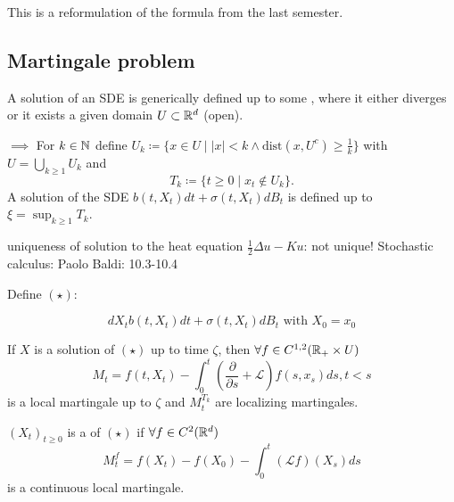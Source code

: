 \begin{remark}
    This is a reformulation of the formula from the last semester.
\end{remark}

\subsection{Martingale problem}

A solution of an SDE is generically defined up to some ,
where it either diverges or it exists a given domain $U\subset\mathbb{R}^d$ (open).

$\implies$ For $k\in\mathbb{N}$ define $U_k\coloneqq \{x\in U\mid |x|<k\land \text{dist}(x,U^c)\geq \frac{1}{k}\}$
with $U=\bigcup_{k\geq 1} U_k$ and 
\[T_k\coloneqq \{t\geq 0\mid x_t\notin U_k\}.\]
A solution of the SDE $b(t,X_t)dt+ \sigma(t,X_t)dB_t$ is defined up to $\xi=\sup_{k\geq 1} T_k$.



\begin{aremark}
    uniqueness of solution to the heat equation $\frac{1}{2}\Delta u -Ku$: not unique!
    Stochastic calculus: Paolo Baldi: 10.3-10.4
\end{aremark}


Define $(\star)$:

\[dX_t b(t,X_t)dt+\sigma(t,X_t)dB_t\text{ with } X_0=x_0\]

\begin{theorem}\label{thm:1.17}
    If $X$ is a solution of $(\star)$ up to time $\zeta$, then $\forall f\in C^{1,2}(\mathbb{R}_+\times U)$
    \[M_t=f(t,X_t)-\int_0^t\left(\frac{\partial}{\partial s}+\mathcal{L}\right)f(s,x_s)ds, t<s\]
    is a local martingale up to $\zeta$ and $M_t^{T_k}$ are localizing martingales.
\end{theorem}

\begin{definition}\label{def:1.18}
    $(X_t)_{t\geq 0}$ is a  of $(\star)$
    if $\forall f\in C^2(\mathbb{R}^d)$
    \[M_t^f=f(X_t)-f(X_0)-\int_0^t(\mathcal{L}f)(X_s)ds\]
    is a continuous local martingale. 
\end{definition}

